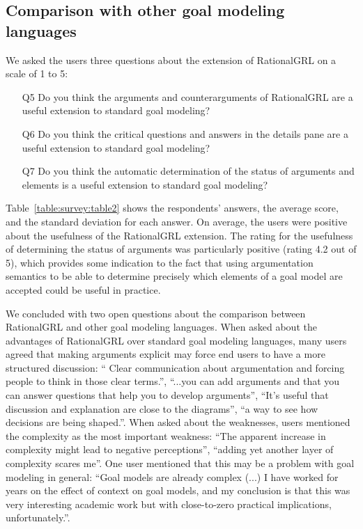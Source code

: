 \subsection{Comparison with other goal modeling languages}

We asked the users three questions about the extension of RationalGRL on a scale of 1 to 5:
\begin{itemize}
\item[Q5] Do you think the arguments and counterarguments of RationalGRL are a useful extension to standard goal modeling?
\item[Q6] Do you think the critical questions and answers in the details pane are a useful extension to standard goal modeling?
\item[Q7] Do you think the automatic determination of the status of arguments and elements is a useful extension to standard goal modeling?
\end{itemize}

Table~\ref{table:survey:table2} shows the respondents' answers, the average score, and the standard deviation for each answer. On average, the users were positive about the usefulness of the RationalGRL extension. The rating for the usefulness of determining the status of arguments was particularly positive (rating 4.2 out of 5), which provides some indication to the fact that using argumentation semantics to be able to determine precisely which elements of a goal model are accepted could be useful in practice.

We concluded with two open questions about the comparison between RationalGRL and other goal modeling languages. When asked about the advantages of RationalGRL over standard goal modeling languages, many users agreed that making arguments explicit may force end users to have a more structured discussion: ``	Clear communication about argumentation and forcing people to think in those clear terms.'', ``...you can add arguments and that you can answer questions that help you to develop arguments'', ``It's useful that discussion and explanation are close to the diagrams'', ``a way to see how decisions are being shaped.''. When asked about the weaknesses, users mentioned the complexity as the most important weakness: ``The apparent increase in complexity might lead to negative perceptions'', ``adding yet another layer of complexity scares me''. One user mentioned that this may be a problem with goal modeling in general: ``Goal models are already complex (...) I have worked for years on the effect of context on goal models, and my conclusion is that this was very interesting academic work but with close-to-zero practical implications, unfortunately.''.

